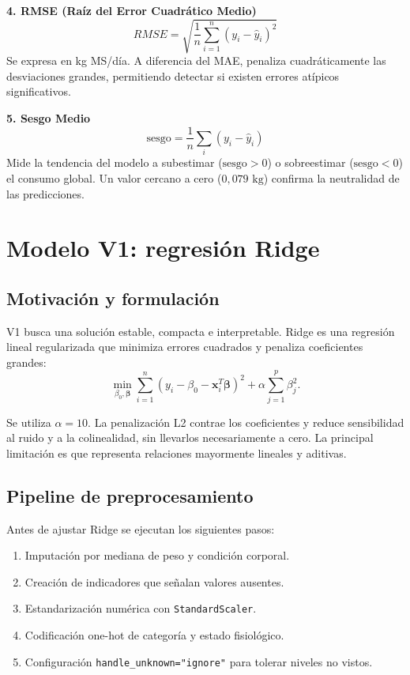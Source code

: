 \documentclass[11pt,a4paper]{article}
\newcommand{\codigo}[1]{\nolinkurl{#1}}
\begin{document}
\textbf{4. RMSE (Raíz del Error Cuadrático Medio)}
\begin{equation}
RMSE = \sqrt{\frac{1}{n}\sum_{i=1}^{n}(y_i - \hat{y}_i)^2}
\end{equation}
Se expresa en kg MS/día. A diferencia del MAE, penaliza cuadráticamente las desviaciones grandes, permitiendo detectar si existen errores atípicos significativos.

\textbf{5. Sesgo Medio}
\begin{equation}
\text{sesgo} = \frac{1}{n}\sum_i(y_i - \hat{y}_i)
\end{equation}
Mide la tendencia del modelo a subestimar ($\text{sesgo} > 0$) o sobreestimar ($\text{sesgo} < 0$) el consumo global. Un valor cercano a cero ($0,079\text{ kg}$) confirma la neutralidad de las predicciones.

\section{Modelo V1: regresión Ridge}

\subsection{Motivación y formulación}

V1 busca una solución estable, compacta e interpretable. Ridge es una regresión lineal regularizada que minimiza errores cuadrados y penaliza coeficientes grandes:
\begin{equation}
\min_{\beta_0,\boldsymbol{\beta}}
\sum_{i=1}^{n}(y_i-\beta_0-\mathbf{x}_i^T\boldsymbol{\beta})^2
+\alpha\sum_{j=1}^{p}\beta_j^2.
\end{equation}

Se utiliza $\alpha=10$. La penalización L2 contrae los coeficientes y reduce sensibilidad al ruido y a la colinealidad, sin llevarlos necesariamente a cero. La principal limitación es que representa relaciones mayormente lineales y aditivas.

\subsection{Pipeline de preprocesamiento}

Antes de ajustar Ridge se ejecutan los siguientes pasos:
\begin{enumerate}
  \item Imputación por mediana de peso y condición corporal.
  \item Creación de indicadores que señalan valores ausentes.
  \item Estandarización numérica con \codigo{StandardScaler}.
  \item Codificación one-hot de categoría y estado fisiológico.
  \item Configuración \codigo{handle_unknown="ignore"} para tolerar niveles no vistos.
\end{enumerate}
\end{document}
